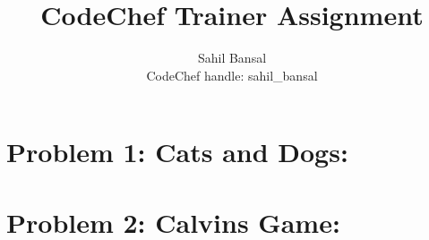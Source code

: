 \documentclass[12pt]{report}
\title{\centering CodeChef Trainer Assignment}
\author{\LARGE Sahil Bansal\\ CodeChef handle: sahil\_bansal}
\begin{document}
\maketitle

\section{Problem 1: Cats and Dogs:}




\section{Problem 2: Calvins Game:}

 
\end{document}
